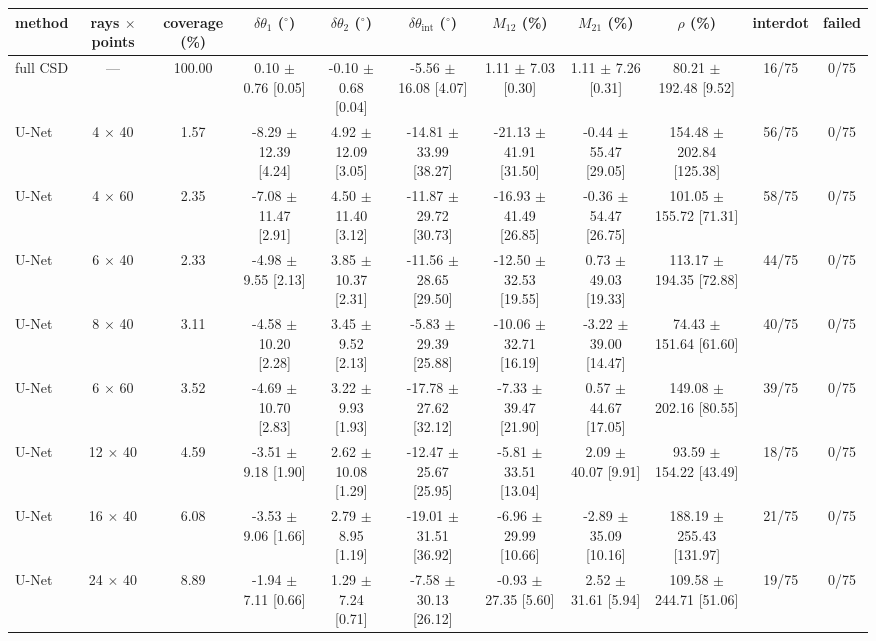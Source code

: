 \begin{tabular}{lcccccccccc}
\hline
method & rays $\times$ points & coverage (\%) & $\delta\theta_1$ ($^\circ$) & $\delta\theta_2$ ($^\circ$) & $\delta\theta_\mathrm{int}$ ($^\circ$) & $M_{12}$ (\%) & $M_{21}$ (\%) & $\rho$ (\%) & interdot & failed \\ \hline
full CSD & — & 100.00 & 0.10 $\pm$ 0.76 [0.05] & -0.10 $\pm$ 0.68 [0.04] & -5.56 $\pm$ 16.08 [4.07] & 1.11 $\pm$ 7.03 [0.30] & 1.11 $\pm$ 7.26 [0.31] & 80.21 $\pm$ 192.48 [9.52] & 16/75 & 0/75 \\
U-Net & 4 $\times$ 40 & 1.57 & -8.29 $\pm$ 12.39 [4.24] & 4.92 $\pm$ 12.09 [3.05] & -14.81 $\pm$ 33.99 [38.27] & -21.13 $\pm$ 41.91 [31.50] & -0.44 $\pm$ 55.47 [29.05] & 154.48 $\pm$ 202.84 [125.38] & 56/75 & 0/75 \\
U-Net & 4 $\times$ 60 & 2.35 & -7.08 $\pm$ 11.47 [2.91] & 4.50 $\pm$ 11.40 [3.12] & -11.87 $\pm$ 29.72 [30.73] & -16.93 $\pm$ 41.49 [26.85] & -0.36 $\pm$ 54.47 [26.75] & 101.05 $\pm$ 155.72 [71.31] & 58/75 & 0/75 \\
U-Net & 6 $\times$ 40 & 2.33 & -4.98 $\pm$ 9.55 [2.13] & 3.85 $\pm$ 10.37 [2.31] & -11.56 $\pm$ 28.65 [29.50] & -12.50 $\pm$ 32.53 [19.55] & 0.73 $\pm$ 49.03 [19.33] & 113.17 $\pm$ 194.35 [72.88] & 44/75 & 0/75 \\
U-Net & 8 $\times$ 40 & 3.11 & -4.58 $\pm$ 10.20 [2.28] & 3.45 $\pm$ 9.52 [2.13] & -5.83 $\pm$ 29.39 [25.88] & -10.06 $\pm$ 32.71 [16.19] & -3.22 $\pm$ 39.00 [14.47] & 74.43 $\pm$ 151.64 [61.60] & 40/75 & 0/75 \\
U-Net & 6 $\times$ 60 & 3.52 & -4.69 $\pm$ 10.70 [2.83] & 3.22 $\pm$ 9.93 [1.93] & -17.78 $\pm$ 27.62 [32.12] & -7.33 $\pm$ 39.47 [21.90] & 0.57 $\pm$ 44.67 [17.05] & 149.08 $\pm$ 202.16 [80.55] & 39/75 & 0/75 \\
U-Net & 12 $\times$ 40 & 4.59 & -3.51 $\pm$ 9.18 [1.90] & 2.62 $\pm$ 10.08 [1.29] & -12.47 $\pm$ 25.67 [25.95] & -5.81 $\pm$ 33.51 [13.04] & 2.09 $\pm$ 40.07 [9.91] & 93.59 $\pm$ 154.22 [43.49] & 18/75 & 0/75 \\
U-Net & 16 $\times$ 40 & 6.08 & -3.53 $\pm$ 9.06 [1.66] & 2.79 $\pm$ 8.95 [1.19] & -19.01 $\pm$ 31.51 [36.92] & -6.96 $\pm$ 29.99 [10.66] & -2.89 $\pm$ 35.09 [10.16] & 188.19 $\pm$ 255.43 [131.97] & 21/75 & 0/75 \\
U-Net & 24 $\times$ 40 & 8.89 & -1.94 $\pm$ 7.11 [0.66] & 1.29 $\pm$ 7.24 [0.71] & -7.58 $\pm$ 30.13 [26.12] & -0.93 $\pm$ 27.35 [5.60] & 2.52 $\pm$ 31.61 [5.94] & 109.58 $\pm$ 244.71 [51.06] & 19/75 & 0/75 \\
\hline
\end{tabular}
